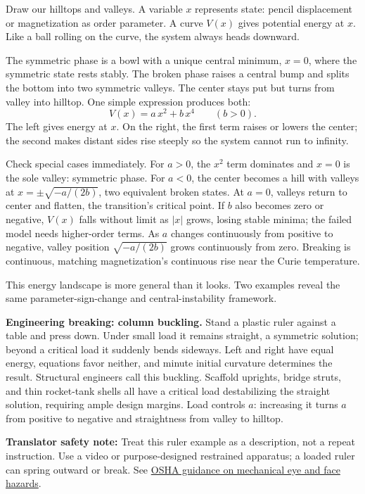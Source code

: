 
\begin{mainline}
Draw our hilltops and valleys. A variable \(x\) represents state: pencil displacement or magnetization as order parameter. A curve \(V(x)\) gives potential energy at \(x\). Like a ball rolling on the curve, the system always heads downward.

The symmetric phase is a bowl with a unique central minimum, \(x=0\), where the symmetric state rests stably. The broken phase raises a central bump and splits the bottom into two symmetric valleys. The center stays put but turns from valley into hilltop. One simple expression produces both:
\[
V(x)=a\,x^{2}+b\,x^{4}\qquad (b>0).
\]
The left gives energy at \(x\). On the right, the first term raises or lowers the center; the second makes distant sides rise steeply so the system cannot run to infinity.

Check special cases immediately. For \(a>0\), the \(x^{2}\) term dominates and \(x=0\) is the sole valley: symmetric phase. For \(a<0\), the center becomes a hill with valleys at \(x=\pm\sqrt{-a/(2b)}\), two equivalent broken states. At \(a=0\), valleys return to center and flatten, the transition's critical point. If \(b\) also becomes zero or negative, \(V(x)\) falls without limit as \(|x|\) grows, losing stable minima; the failed model needs higher-order terms. As \(a\) changes continuously from positive to negative, valley position \(\sqrt{-a/(2b)}\) grows continuously from zero. Breaking is continuous, matching magnetization's continuous rise near the Curie temperature.

This energy landscape is more general than it looks. Two examples reveal the same parameter-sign-change and central-instability framework.

\textbf{Engineering breaking: column buckling.} Stand a plastic ruler against a table and press down. Under small load it remains straight, a symmetric solution; beyond a critical load it suddenly bends sideways. Left and right have equal energy, equations favor neither, and minute initial curvature determines the result. Structural engineers call this buckling. Scaffold uprights, bridge struts, and thin rocket-tank shells all have a critical load destabilizing the straight solution, requiring ample design margins. Load controls \(a\): increasing it turns \(a\) from positive to negative and straightness from valley to hilltop.

\textbf{Translator safety note:} Treat this ruler example as a description, not a repeat instruction. Use a video or purpose-designed restrained apparatus; a loaded ruler can spring outward or break. See \href{https://www.osha.gov/eye-face-protection}{OSHA guidance on mechanical eye and face hazards}.


\end{mainline}
